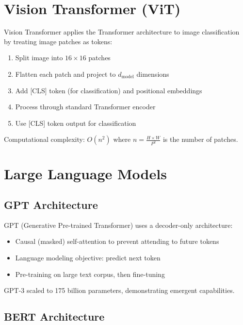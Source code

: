 \section{Vision Transformer (ViT)}

Vision Transformer \cite{dosovitskiy2020image} applies the Transformer architecture to image classification by treating image patches as tokens:

\begin{enumerate}
    \item Split image into $16 \times 16$ patches
    \item Flatten each patch and project to $d_{\text{model}}$ dimensions
    \item Add [CLS] token (for classification) and positional embeddings
    \item Process through standard Transformer encoder
    \item Use [CLS] token output for classification
\end{enumerate}

Computational complexity: $O(n^2)$ where $n = \frac{H \times W}{P^2}$ is the number of patches.

\section{Large Language Models}

\subsection{GPT Architecture}

GPT (Generative Pre-trained Transformer) \cite{radford2019language,brown2020language} uses a decoder-only architecture:
\begin{itemize}
    \item Causal (masked) self-attention to prevent attending to future tokens
    \item Language modeling objective: predict next token
    \item Pre-training on large text corpus, then fine-tuning
\end{itemize}

GPT-3 scaled to 175 billion parameters, demonstrating emergent capabilities.

\subsection{BERT Architecture}

